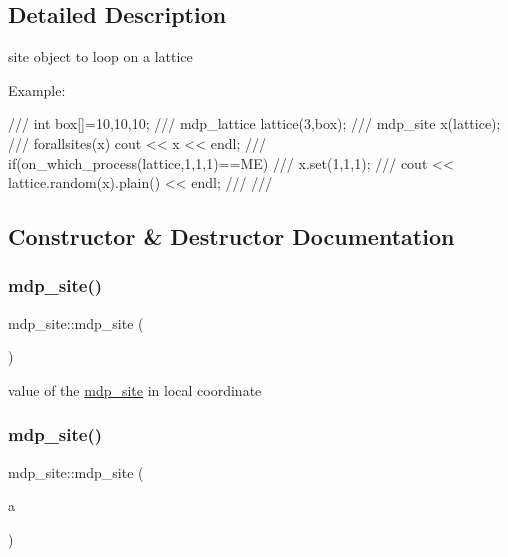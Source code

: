 \subsection{Detailed Description}
site object to loop on a lattice 

Example\+: \begin{DoxyVerb}///   int box[]={10,10,10};
///   mdp_lattice lattice(3,box);
///   mdp_site x(lattice);
///   forallsites(x) cout << x << endl;
///   if(on_which_process(lattice,1,1,1)==ME) {
///      x.set(1,1,1);
///      cout << lattice.random(x).plain() << endl;
///   }
/// \end{DoxyVerb}
 

\subsection{Constructor \& Destructor Documentation}
\mbox{\label{classmdp__site_a9c6937993f8faf46420b724f03f3649d}} 
\subsubsection{\texorpdfstring{mdp\+\_\+site()}{mdp\_site()}\hspace{0.1cm}{\footnotesize\ttfamily [1/4]}}
{\footnotesize\ttfamily mdp\+\_\+site\+::mdp\+\_\+site (\begin{DoxyParamCaption}{ }\end{DoxyParamCaption})\hspace{0.3cm}{\ttfamily [inline]}}



value of the \hyperlink{classmdp__site}{mdp\+\_\+site} in local coordinate 

\mbox{\label{classmdp__site_ab61e8e96573d58449ee28b9505ca799b}} 
\subsubsection{\texorpdfstring{mdp\+\_\+site()}{mdp\_site()}\hspace{0.1cm}{\footnotesize\ttfamily [2/4]}}
{\footnotesize\ttfamily mdp\+\_\+site\+::mdp\+\_\+site (\begin{DoxyParamCaption}\item[{const \hyperlink{classmdp__lattice}{mdp\+\_\+lattice} \&}]{a }\end{DoxyParamCaption})\hspace{0.3cm}{\ttfamily [inline]}}

